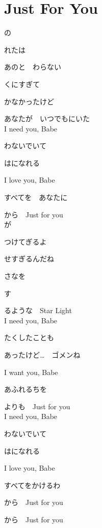 \section{ Just For You}
\large{

の

れたは

あのと　わらない

くにすぎて

かなかったけど

あなたが　いつでもにいた
\\

I need you, Babe

わないでいて

はになれる

I love you, Babe

すべてを　あなたに

から　Just for you
\\

が

つけてぎるよ

せすぎるんだね

さなを

す

るような　Star Light
\\

I need you, Babe

たくしたことも

あったけど…　ゴメンね

I want you, Babe

あふれるちを

よりも　Just for you
\\

I need you, Babe

わないでいて

はになれる

I love you, Babe

すべてをかけるわ

から　Just for you

から　Just for you

}